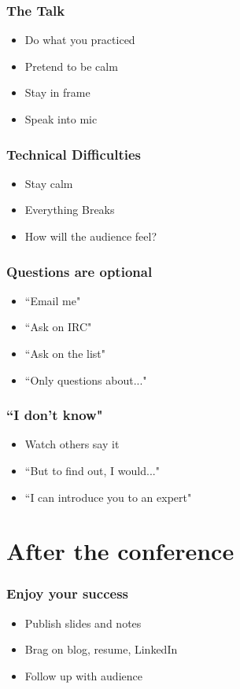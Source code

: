 \documentclass{beamer}
\begin{document}
\begin{frame}[fragile]
\frametitle{The Talk}
\begin{itemize}
\item Do what you practiced
\item Pretend to be calm
\item Stay in frame
\item Speak into mic
\end{itemize}
\end{frame}

\begin{frame}[fragile]
\frametitle{Technical Difficulties}
\begin{itemize}
\item Stay calm
\item Everything Breaks
\item How will the audience feel?
\end{itemize}
\end{frame}

\begin{frame}[fragile]
\frametitle{Questions are optional}
\begin{itemize}
\item ``Email me"
\item ``Ask on IRC"
\item ``Ask on the list"
\item ``Only questions about..."
\end{itemize}
\end{frame}

\begin{frame}[fragile]
\frametitle{``I don't know"}
\begin{itemize}
\item Watch others say it
\item ``But to find out, I would..."
\item ``I can introduce you to an expert"
\end{itemize}
\end{frame}

\section{After the conference}

\begin{frame}[fragile]
\tableofcontents[currentsection]
\end{frame}

\begin{frame}[fragile]
\frametitle{Enjoy your success}
\begin{itemize}
\item Publish slides and notes
\item Brag on blog, resume, LinkedIn
\item Follow up with audience
\end{itemize}
\end{frame}
\end{document}
